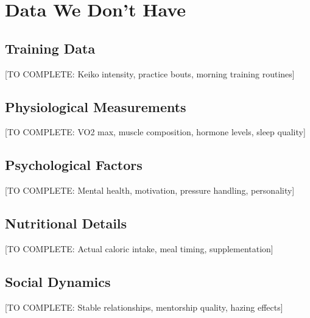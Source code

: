 \section{Data We Don't Have}

\subsection{Training Data}

[TO COMPLETE: Keiko intensity, practice bouts, morning training routines]

\subsection{Physiological Measurements}

[TO COMPLETE: VO2 max, muscle composition, hormone levels, sleep quality]

\subsection{Psychological Factors}

[TO COMPLETE: Mental health, motivation, pressure handling, personality]

\subsection{Nutritional Details}

[TO COMPLETE: Actual caloric intake, meal timing, supplementation]

\subsection{Social Dynamics}

[TO COMPLETE: Stable relationships, mentorship quality, hazing effects]